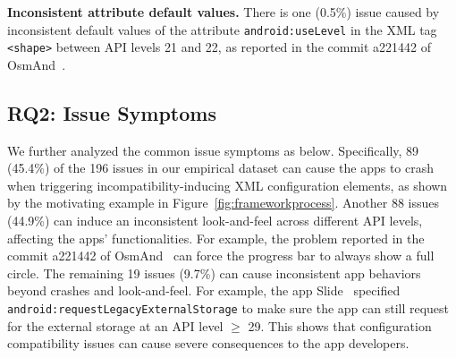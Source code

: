 \textbf{Inconsistent attribute default values.}
There is one (0.5\%) issue caused by inconsistent default values of the attribute \texttt{android:useLevel} in the XML tag \texttt{<shape>} between API levels 21 and 22, as reported in the commit a221442 of OsmAnd~\cite{osmand}.

\subsection{RQ2: Issue Symptoms}
We further analyzed the common issue symptoms as below.
Specifically, 89 (45.4\%) of the 196 issues in our empirical dataset can cause the apps to crash when triggering incompatibility-inducing XML configuration elements, as shown by the motivating example in Figure~\ref{fig:frameworkprocess}.
Another 88 issues (44.9\%) can induce an inconsistent look-and-feel across different API levels, affecting the apps' functionalities.
For example, the problem reported in the commit a221442 of OsmAnd~\cite{osmand} can force the progress bar to always show a full circle.
The remaining 19 issues (9.7\%) can cause inconsistent app behaviors beyond crashes and look-and-feel.
For example, the app Slide~\cite{slide} specified \texttt{android:requestLegacyExternalStorage} to make sure the app can still request for the external storage at an API level $\geq$ 29.
This shows that configuration compatibility issues can cause severe consequences to the app developers.
